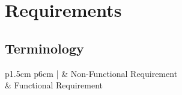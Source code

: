 \chapter{Requirements}


\section{Terminology}
\begin{tabular}{p{1.5cm} p{6cm} | }
	\hline
	 & Non-Functional Requirement\\
	 & Functional Requirement\\
	\hline
\end{tabular}



\newpage



\newpage


